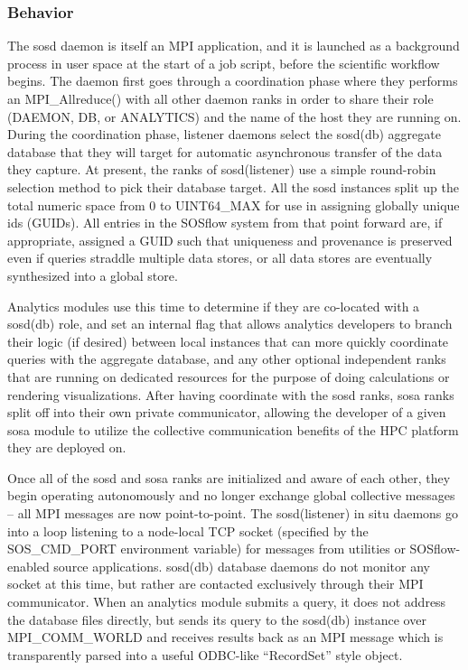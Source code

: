 \subsubsection{Behavior}
The sosd daemon is itself an MPI application, and it is launched as a
background process in user space at the start of a job script, before
the scientific workflow begins.  The daemon first goes through a
coordination phase where they performs an MPI\_Allreduce() with all
other daemon ranks in order to share their role (DAEMON, DB, or
ANALYTICS) and the name of the host they are running on. During the
coordination phase, listener daemons select the sosd(db) aggregate
database that they will target for automatic asynchronous transfer of
the data they capture. At present, the ranks of sosd(listener) use a
simple round-robin selection method to pick their database target. All
the sosd instances split up the total numeric space from 0 to
UINT64\_MAX for use in assigning globally unique ids (GUIDs). All
entries in the SOSflow system from that point forward are, if
appropriate, assigned a GUID such that uniqueness and provenance is
preserved even if queries straddle multiple data stores, or all data
stores are eventually synthesized into a global store.

Analytics modules use this time to determine if they are co-located
with a sosd(db) role, and set an internal flag that allows analytics
developers to branch their logic (if desired) between local instances that
can more quickly coordinate queries with the aggregate database, and any 
other optional independent ranks that are running on dedicated resources
for the purpose of doing calculations or rendering visualizations. After
having coordinate with the sosd ranks, sosa ranks split off into their own
private communicator, allowing the developer of a given sosa module to
utilize the collective communication benefits of the HPC platform they
are deployed on.

Once all of the sosd and sosa ranks are initialized and aware of each
other, they begin operating autonomously and no longer exchange global
collective messages -- all MPI messages are now point-to-point. The
sosd(listener) in situ daemons go into a loop listening to a
node-local TCP socket (specified by the SOS\_CMD\_PORT environment
variable) for messages from utilities or SOSflow-enabled source
applications.  sosd(db) database daemons do not monitor any socket at
this time, but rather are contacted exclusively through their MPI
communicator. When an analytics module submits a query, it does not
address the database files directly, but sends its query to the
sosd(db) instance over MPI\_COMM\_WORLD and receives results back as
an MPI message which is transparently parsed into a useful ODBC-like
``RecordSet'' style object.

